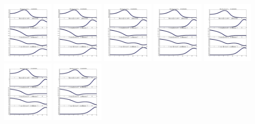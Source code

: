 \documentclass[11pt]{article}
\begin{document}
\vskip 10pt 
\includegraphics[width=0.19\textwidth]{frame0013fig1.png}
\vskip 10pt 
\includegraphics[width=0.19\textwidth]{frame0014fig1.png}
\vskip 10pt 
\includegraphics[width=0.19\textwidth]{frame0015fig1.png}
\vskip 10pt 
\includegraphics[width=0.19\textwidth]{frame0016fig1.png}
\vskip 10pt 
\includegraphics[width=0.19\textwidth]{frame0017fig1.png}
\vskip 10pt 
\includegraphics[width=0.19\textwidth]{frame0018fig1.png}
\vskip 10pt 
\includegraphics[width=0.19\textwidth]{frame0019fig1.png}
\end{document}
